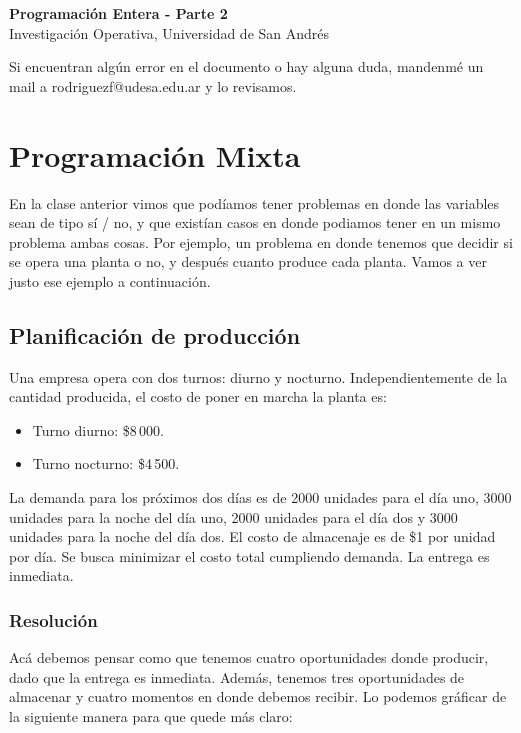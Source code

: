 \documentclass[12pt]{article}
\begin{document}
\begin{center}
  {\LARGE \textbf{Programación Entera - Parte 2}}\\[0.5em]
  {Investigación Operativa, Universidad de San Andrés}
\end{center}

Si encuentran algún error en el documento o hay alguna duda, mandenmé un mail a rodriguezf@udesa.edu.ar y lo revisamos.

\section{Programación Mixta}

En la clase anterior vimos que podíamos tener problemas en donde las variables sean de tipo sí / no, y que existían casos en donde podiamos tener en un mismo problema ambas cosas. Por ejemplo, un problema en donde tenemos que decidir si se opera una planta o no, y después cuanto produce cada planta. Vamos a ver justo ese ejemplo a continuación.

\subsection{Planificación de producción}
Una empresa opera con dos turnos: diurno y nocturno. Independientemente de la cantidad producida, el costo de poner en marcha la planta es:
\begin{itemize}
    \item Turno diurno: \$8\,000.
    \item Turno nocturno: \$4\,500.
\end{itemize}

La demanda para los próximos dos días es de 2000 unidades para el día uno, 3000 unidades para la noche del día uno, 2000 unidades para el día dos y 3000 unidades para la noche del día dos. El costo de almacenaje es de \$1 por unidad por día. Se busca minimizar el costo total cumpliendo demanda. La entrega es inmediata.

\subsubsection{Resolución}

Acá debemos pensar como que tenemos cuatro oportunidades donde producir, dado que la entrega es inmediata. Además, tenemos tres oportunidades de almacenar y cuatro momentos en donde debemos recibir. Lo podemos gráficar de la siguiente manera para que quede más claro:
\end{document}

